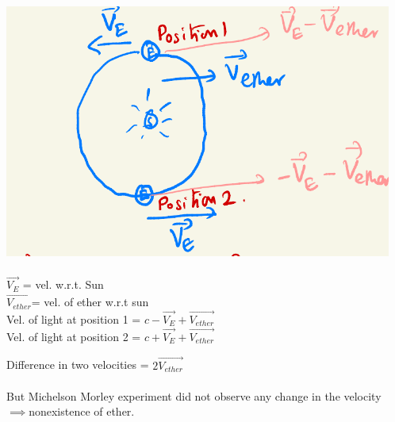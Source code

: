 \documentclass{article}
\begin{document}
\includegraphics[width=0.5\linewidth]{ether.png}\\ \\
   $\vec{V_E}$ = vel. w.r.t. Sun
   \\
   $\vec{V_{ether}}$= vel. of ether w.r.t sun
   \\
   Vel. of light at position 1 = $c-\vec{V_E}+\vec{V_{ether}}$\\
   Vel. of light at position 2 = $c+\vec{V_E}+\vec{V_{ether}}$


Difference in two velocities = $2\vec{V_{ether}}$
\\ \\ But Michelson Morley experiment did not observe any change in the velocity \\
$\implies $nonexistence of ether.
\end{document}
